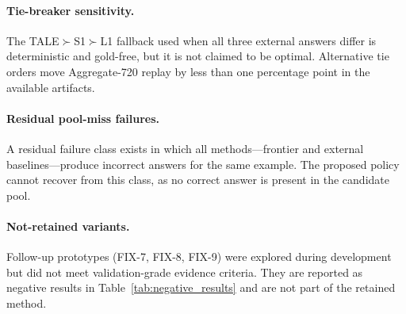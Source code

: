 \paragraph{Tie-breaker sensitivity.}
The TALE$\succ$S1$\succ$L1 fallback used when all three external answers differ is deterministic and gold-free, but it is not claimed to be optimal. Alternative tie orders move Aggregate-720 replay by less than one percentage point in the available artifacts.

\paragraph{Residual pool-miss failures.}
A residual failure class exists in which all methods---frontier and external baselines---produce incorrect answers for the same example. The proposed policy cannot recover from this class, as no correct answer is present in the candidate pool.

\paragraph{Not-retained variants.}
Follow-up prototypes (FIX-7, FIX-8, FIX-9) were explored during development but did not meet validation-grade evidence criteria. They are reported as negative results in Table~\ref{tab:negative_results} and are not part of the retained method.
